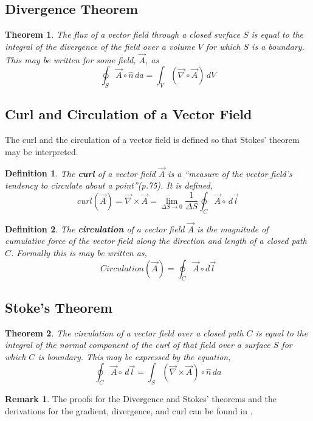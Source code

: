 \documentclass[12pt]{article}
\newtheorem{theorem}{Theorem}[section]
\newtheorem{definition}{Definition}[section]
\theoremstyle{definition}
\newtheorem*{remark}{Remark}
\numberwithin{equation}{section}
\begin{document}
{\subsection{Divergence Theorem}
\begin{theorem}The flux of a vector field through a closed surface $S$ is equal to the integral of the divergence of the field over a volume $V$ for which $S$ is a boundary. This may be written for some field, $\vec{A}$, as
\label{divthm}
\begin{equation}
\oint_{S}\vec{A}\circ\hat{n}\,da = \int_{V}(\vec{\nabla}\circ\vec{A})\,dV
\label{divthm.eqn}
\end{equation}
\end{theorem}
\subsection{Curl and Circulation of a Vector Field}
The curl and the circulation of a vector field is defined so that Stokes' theorem may be interpreted.
\begin{definition}The \textbf{curl} of a vector field $\vec{A}$ is a \enquote{measure of the vector field's tendency to circulate about a point}(p.75)\cite{Flei}. It is defined,
\begin{equation}
curl(\vec{A})=\vec{\nabla}\times\vec{A}=\lim_{\Delta S\to 0}\frac{1}{\Delta S}\oint_{C}\vec{A}\circ\,d\vec{l}
\label{curl.eqn}
\end{equation}
\end{definition}
\begin{definition}The \textbf{circulation} of a vector field $\vec{A}$ is the magnitude of cumulative force of the vector field along the direction and length of a closed path $C$. Formally this is may be written as,
\begin{equation}
Circulation(\vec{A})=\oint_{C}\vec{A}\circ d\vec{l}
\label{circulation.eqn}
\end{equation}
\end{definition}
\subsection{Stoke's Theorem}
\begin{theorem}The circulation of a vector field over a closed path $C$ is equal to the integral of the normal component of the curl of that field over a surface $S$ for which $C$ is boundary. This may be expressed by the equation,
\begin{equation}
\oint_{C}\vec{A}\circ\,d\vec{l}=\int_{S}(\vec{\nabla}\times\vec{A})\circ\hat{n}\,da
\label{stokes.eqn}
\end{equation}
\end{theorem}
\begin{remark} 
The proofs for the Divergence and Stokes' theorems and the derivations for the gradient, divergence, and curl can be found in \cite{Reitz}.
\end{remark}
}
\end{document}
